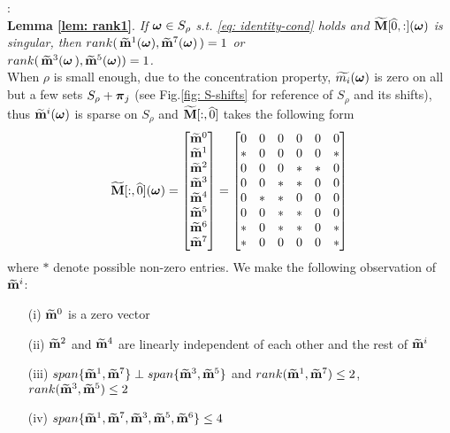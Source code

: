 :\\[.2em]
{\bf Lemma \ref{lem: rank1}}. {\it 
If $\boldsymbol{\omega}\in S_\rho$ s.t. \eqref{eq: identity-cond} holds and $\widetilde{\mathbf{M}}[\widehat{0},:](\boldsymbol{\omega})$ is singular, then $rank(\,\widetilde{\mathbf{m}}^{1}(\boldsymbol{\omega}),\widetilde{\mathbf{m}}^{7}(\boldsymbol{\omega})\,)=1$ or \\$rank(\,\widetilde{\mathbf{m}}^{3}(\boldsymbol{\omega}\,),\widetilde{\mathbf{m}}^{5}(\boldsymbol{\omega})) = 1$.
}\\[1em]
When $\rho$ is small enough, due to the concentration property, $\widetilde{m_{i}}(\boldsymbol{\omega})$ is zero on all but a few sets $S_\rho + \boldsymbol{\pi}_j$ (see Fig.\ref{fig: S-shifts} for reference of $S_\rho$ and its shifts), thus $\widetilde{\mathbf{m}}^{i}(\boldsymbol{\omega})$ is sparse on $S_\rho$ and $\widetilde{\mathbf{M}}[:,\widehat{0}]$ takes the following form
\begin{align}
\label{eq: sparse-mat}
\widetilde{\mathbf{M}}[:,\widehat{0}](\boldsymbol{\omega})=
\begin{bmatrix}
\widetilde{\mathbf{m}}^{0}\\
\widetilde{\mathbf{m}}^{1}\\
\widetilde{\mathbf{m}}^{2}\\
\widetilde{\mathbf{m}}^{3}\\
\widetilde{\mathbf{m}}^{4}\\
\widetilde{\mathbf{m}}^{5}\\
\widetilde{\mathbf{m}}^{6}\\
\widetilde{\mathbf{m}}^{7}
\end{bmatrix}
=
\begin{bmatrix}
0 & 0 & 0 & 0 & 0 & 0\\
* & 0 & 0 & 0 & 0 & *\\
0 & 0 & 0 & * & * & 0\\
0 & 0 & * & * & 0 & 0\\
0 & * & * & 0 & 0 & 0\\
0 & 0 & * & * & 0 & 0\\
* & 0 & * & * & 0 & *\\
* & 0 & 0 & 0 & 0 & *
\end{bmatrix}
\end{align}
where $*$ denote possible non-zero entries.
We make the following observation of $\widetilde{\mathbf{m}}^{i}$:
\begin{itemize}
\item[(i)] $\widetilde{\mathbf{m}}^{0}$ is a zero vector
\item[(ii)] $\widetilde{\mathbf{m}}^{2}$ and $\widetilde{\mathbf{m}}^{4}$ are linearly independent of each other and the rest of $\widetilde{\mathbf{m}}^{i}$
\item[(iii)] $span\{\widetilde{\mathbf{m}}^{1},\widetilde{\mathbf{m}}^{7}\} \perp span\{\widetilde{\mathbf{m}}^{3},\widetilde{\mathbf{m}}^{5}\}$ and $rank(\widetilde{\mathbf{m}}^{1},\widetilde{\mathbf{m}}^{7}) \leq 2$, \\$rank(\widetilde{\mathbf{m}}^{3},\widetilde{\mathbf{m}}^{5})\leq 2$
\item[(iv)] $span\{\widetilde{\mathbf{m}}^{1}, \widetilde{\mathbf{m}}^{7}, \widetilde{\mathbf{m}}^{3},\widetilde{\mathbf{m}}^{5},\widetilde{\mathbf{m}}^{6}\} \leq 4$
\end{itemize}
